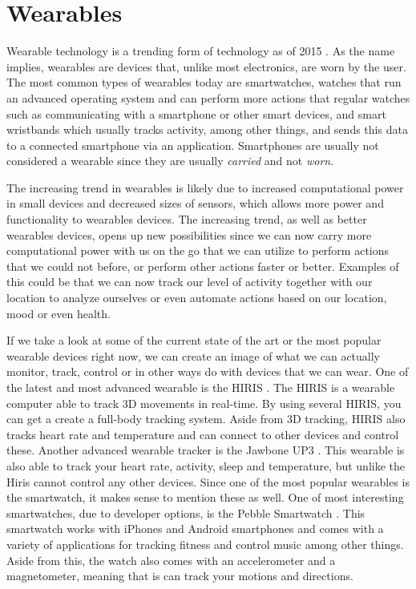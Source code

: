 \section{Wearables}\label{sec:wearables} %
Wearable technology is a trending form of technology as of 2015 \cite{WEARABLESTREND}. As the name implies, wearables are devices that, unlike most electronics, are worn by the user. The most common types of wearables today are smartwatches, \ie watches that run an advanced operating system and can perform more actions that regular watches such as communicating with a smartphone or other smart devices, and smart wristbands which usually tracks activity, among other things, and sends this data to a connected smartphone via an application. Smartphones are usually not considered a wearable since they are usually \emph{carried} and not \emph{worn}. 

The increasing trend in wearables is likely due to increased computational power in small devices and decreased sizes of sensors, which allows more power and functionality to wearables devices. The increasing trend, as well as better wearables devices, opens up new possibilities since we can now carry more computational power with us on the go that we can utilize to perform actions that we could not before, or perform other actions faster or better. Examples of this could be that we can now track our level of activity together with our location to analyze ourselves or even automate actions based on our location, mood or even health. 

If we take a look at some of the current state of the art or the most popular wearable devices right now, we can create an image of what we can actually monitor, track, control or in other ways do with devices that we can wear. One of the latest and most advanced wearable is the HIRIS \cite{hirisweb}. The HIRIS is a wearable computer able to track 3D movements in real-time. By using several HIRIS, you can get a create a full-body tracking system. Aside from 3D tracking, HIRIS also tracks heart rate and temperature and can connect to other devices and control these. Another advanced wearable tracker is the Jawbone UP3 \cite{JAWBONE}. This wearable is also able to track your heart rate, activity, sleep and temperature, but unlike the Hiris cannot control any other devices. Since one of the most popular wearables is the smartwatch, it makes sense to mention these as well. One of most interesting smartwatches, due to developer options, is the Pebble Smartwatch \cite{PEBBLE}. This smartwatch works with iPhones and Android smartphones and comes with a variety of applications for tracking fitness and control music among other things. Aside from this, the watch also comes with an accelerometer and a magnetometer, meaning that is can track your motions and directions. 

